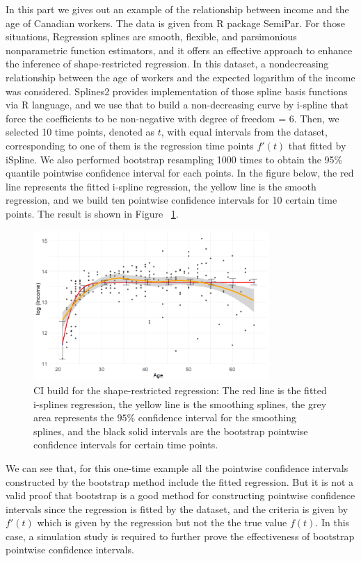 \documentclass[12pt]{article}
\begin{document}
 In this part we gives out an example of the relationship between income and the age of Canadian workers. The data is given from R package SemiPar. For those situations, Regression splines are smooth, flexible, and parsimonious nonparametric function estimators, and it offers an effective approach to enhance the inference of shape-restricted regression. \cite{meyer2008inference} In this dataset, a nondecreasing relationship between the age of workers and the expected logarithm of the income was considered. \cite{wang2021shape}  Splines2 provides implementation of those spline basis functions via R language, and we use that to build a non-decreasing curve by i-spline that force the coefficients to be non-negative with degree of freedom = 6. Then, we selected 10 time points, denoted as $t$, with equal intervals from the dataset, corresponding to one of them is the regression time points \(f'(t)\) that fitted by iSpline. We also performed bootstrap resampling 1000 times to obtain the 95\% quantile pointwise confidence interval for each points. In the figure below, the red line represents the fitted i-spline regression, the yellow line is the smooth regression, and we build ten pointwise confidence intervals for 10 certain time points. The result is shown in Figure ~\ref{fig:semipar}.


\begin{figure}[H]
  \centering
  \includegraphics[width=0.8\textwidth]{SemiparCI.png}
  \caption{CI build for the shape-restricted regression: The red line is the fitted i-splines regression, the yellow line is the smoothing splines, the grey area represents the \(95\%\) confidence interval for the smoothing splines, and the black solid intervals are the bootstrap pointwise confidence intervals for certain time points. }
  \label{fig:semipar}
\end{figure}

We can see that, for this one-time example all the pointwise confidence intervals constructed by the bootstrap method include the fitted regression. But it is not a valid proof that bootstrap is a good method for constructing pointwise confidence intervals since the regression is fitted by the dataset, and the criteria is given by \(f'(t)\) which is given by the regression but not the the true value \(f(t)\). In this case, a simulation study is required to further prove the effectiveness of bootstrap pointwise confidence intervals.
\end{document}
